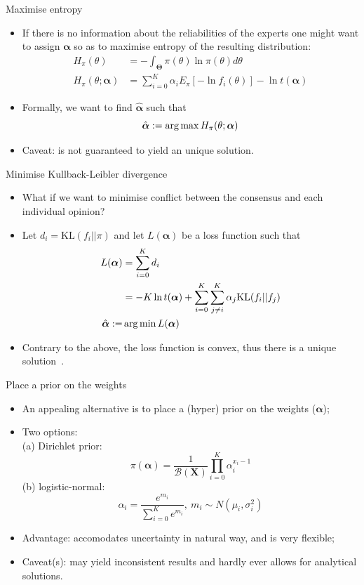 \begin{frame}{Maximise entropy}
 \begin{itemize}
  \item If there is no information about the reliabilities of the experts one might want to assign $\boldsymbol\alpha$ so as to maximise entropy of the resulting distribution:
  \begin{align*}
   H_{\pi}(\theta) &=-\int_{\boldsymbol\Theta}\pi(\theta)\ln\pi(\theta)d\theta \\
   H_{\pi}(\theta; \boldsymbol\alpha) &= \sum_{i=0}^{K} \alpha_i E_{\pi}[ - \ln f_i(\theta)] - \ln t(\boldsymbol\alpha)
  \end{align*}
  \item Formally, we want to find $\hat{\boldsymbol\alpha}$ such that
  \[\hat{\boldsymbol\alpha}:= \operatorname*{arg\,max} H_{\pi}(\theta; \boldsymbol\alpha)  \]
  \item Caveat: is not guaranteed to yield an unique solution.
 \end{itemize}
\end{frame}
\begin{frame}{Minimise Kullback-Leibler divergence}
\begin{itemize}
 \item What if we want to minimise conflict between the consensus and each individual opinion?
 \item Let $d_i = \text{KL}(f_i || \pi)$ and let $L(\boldsymbol\alpha)$ be a loss function such that
\begin{align}
L(\boldsymbol\alpha) &= \sum_{i=0}^Kd_i \\
     &= -K\ln t(\boldsymbol\alpha) + \sum_{i=0}^K\sum_{j\neq i}^K\alpha_j\text{KL}(f_i||f_j) \\
     \hat{\boldsymbol\alpha}:=& \operatorname*{arg\,min} L(\boldsymbol\alpha)   
\end{align}
\item Contrary to the above, the loss function is convex, thus there is a unique solution~\citep{rufo2012A}.
\end{itemize}
\end{frame}
\begin{frame}{Place a prior on the weights}
 \begin{itemize}
  \item An appealing alternative is to place a (hyper) prior on the weights ($\boldsymbol\alpha$);
  \item Two options:\\
 (a) Dirichlet prior:
\[ \pi(\boldsymbol\alpha) = \frac{1}{\mathcal{B}(\boldsymbol X)}\prod_{i=0}^K \alpha_i^{x_i-1}\]
 (b) logistic-normal:
 \[\alpha_i = \frac{e^{m_i}}{\sum_{i=0}^{K} e^{m_i}}, \: m_i \sim N(\mu_i, \sigma_i^2)\]
 \item Advantage: accomodates uncertainty in natural way, and is very flexible;
 \item Caveat(s): may yield inconsistent results and hardly ever allows for analytical solutions.
 \end{itemize}
\end{frame}
